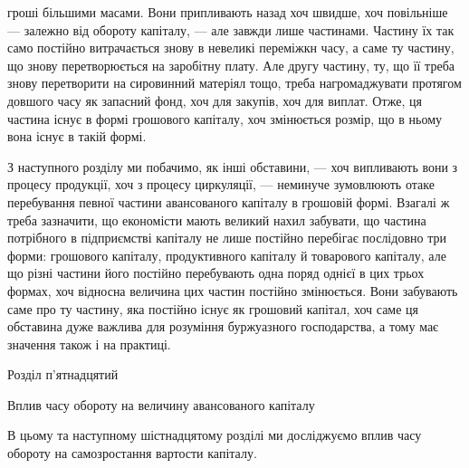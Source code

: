\parcont{}  %
гроші більшими масами. Вони припливають назад хоч швидше, хоч повільніше
— залежно від обороту капіталу, — але завжди лише частинами.
Частину їх так само постійно витрачається знову в невеликі переміжкн
часу, а саме ту частину, що знову перетворюється на заробітну плату.
Але другу частину, ту, що її треба знову перетворити на сировинний
матеріял тощо, треба нагромаджувати протягом довшого часу як запасний
фонд, хоч для закупів, хоч для виплат. Отже, ця частина існує в формі
грошового капіталу, хоч змінюється розмір, що в ньому вона існує в
такій формі.

З наступного розділу ми побачимо, як інші обставини, — хоч випливають
вони з процесу продукції, хоч з процесу циркуляції, — неминуче
зумовлюють отаке перебування певної частини авансованого капіталу в
грошовій формі. Взагалі ж треба зазначити, що економісти мають великий
нахил забувати, що частина потрібного в підприємстві капіталу не лише
постійно перебігає послідовно три форми: грошового капіталу, продуктивного
капіталу й товарового капіталу, але що різні частини його постійно
перебувають одна поряд однієї в цих трьох формах, хоч відносна
величина цих частин постійно змінюється. Вони забувають саме про ту
частину, яка постійно існує як грошовий капітал, хоч саме ця обставина
дуже важлива для розуміння буржуазного господарства, а тому має значення
також і на практиці.

Розділ п’ятнадцятий

Вплив часу обороту на величину авансованого
капіталу

В цьому та наступному шістнадцятому розділі ми досліджуємо вплив
часу обороту на самозростання вартости капіталу.

